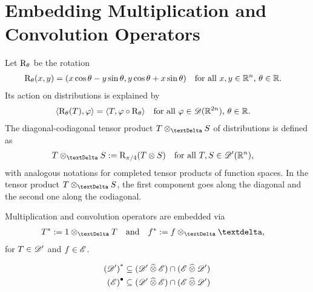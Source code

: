 \section{Embedding Multiplication and Convolution Operators}


Let $ \mathrm{ R }_{\theta} $ be the rotation
\begin{align}
    \mathrm{ R }_{\theta}( x, y )
    &=
    ( x\cos\theta - y\sin\theta, y\cos\theta + x\sin\theta )
    &&\text{for all $ x,y \in \mathbb{ R }^n $, $ \theta \in \mathbb{ R } $.}
\end{align}
Its action on distributions is explained by
\begin{align}
    \langle  \mathrm{ R }_\theta( T )  ,  \varphi  \rangle
    &=
    \langle  T  ,  \varphi \circ \mathrm{ R }_\theta  \rangle
    &&\text{for all $ \varphi \in \mathscr{  D  }( \mathbb{ R }^{2n} ) $, $ \theta \in \mathbb{ R } $.}
\end{align}
The diagonal-codiagonal tensor product $ T \teproDi S $
of distributions is defined as
\begin{align}
    T \teproDi S
    &:=
    \rmR_{\pi/4}( T \tepro S )
    &&\text{for all $ T, S \in \fsDis( \nrR^n ) $,}
\end{align}
with analogous notations for completed tensor products of function spaces.
In the tensor product $ T \teproDi S $,
the first component goes along the diagonal
and the second one along the codiagonal.


Multiplication and convolution operators are embedded via
\begin{align}
    T^*
    &:=
    1 \teproDi T
    &&\text{and}&
    f^*
    &:=
    f \teproDi \sfdeo
    ,
\end{align}
for $ T \in \mathscr{  D  }' $ and $ f \in \mathscr{  E  } $.

\begin{align}
    \left( \mathscr{  D  }' \right)^*
    &\subseteq
    ( \mathscr{  D  }' \mathbin{\widehat{\otimes}} \mathscr{  E  } ) \cap ( \mathscr{  E  } \mathbin{\widehat{\otimes}} \mathscr{  D  }' )
    \\
    \left( \mathscr{  E  } \right)^\bullet
    &\subseteq
    ( \mathscr{  D  }' \mathbin{\widehat{\otimes}} \mathscr{  E  } ) \cap ( \mathscr{  E  } \mathbin{\widehat{\otimes}} \mathscr{  D  }' )
\end{align}